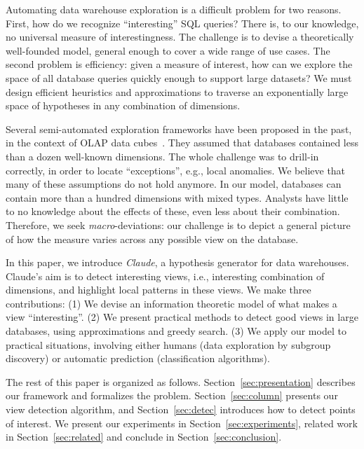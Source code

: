 Automating data warehouse exploration is a difficult problem for
two reasons.  First, how do we recognize ``interesting'' SQL queries?  There
is, to our knowledge, no universal measure of interestingness. The challenge is
to devise a theoretically well-founded model, general enough to cover a wide
range of use cases. The second problem is efficiency: given a measure of
interest, how can we explore the space of all database queries quickly enough to
support large datasets? We must design efficient heuristics and approximations
to traverse an exponentially large space of hypotheses in any combination of dimensions.

Several semi-automated exploration frameworks have been proposed in the
past, in the context of OLAP data cubes~\cite{sarawagi1998discovery,
imielinski2002cubegrades}. They assumed that databases contained less than a
dozen well-known dimensions.  The whole challenge was to drill-in correctly, in
order to locate ``exceptions'', e.g., local anomalies. We believe that many of
these assumptions do not hold anymore. In our model, databases can contain more
than a hundred dimensions with mixed types. Analysts have little to no
knowledge about the effects of these, even less about their combination.
Therefore, we seek \emph{macro}-deviations: our challenge is to depict a
general picture of how the measure varies across any possible view on the database.

In this paper, we introduce \textit{Claude}, a hypothesis generator for data
warehouses. Claude's aim is to detect interesting views, i.e., interesting
combination of dimensions, and highlight local patterns in these views. We make
three contributions: (1) We devise an information theoretic model of what makes
a view ``interesting''. (2) We present practical methods to detect good views
in large databases, using approximations and greedy search. (3) We apply our
model to practical situations, involving either humans (data exploration by subgroup
discovery) or automatic prediction (classification algorithms).

The rest of this paper is organized as follows. Section~\ref{sec:presentation}
describes our framework and formalizes the problem. Section~\ref{sec:column}
presents our view detection algorithm, and Section~\ref{sec:detec}
introduces how to detect points of interest. We present our experiments in
Section~\ref{sec:experiments}, related work in Section~\ref{sec:related} and
conclude in Section~\ref{sec:conclusion}.


